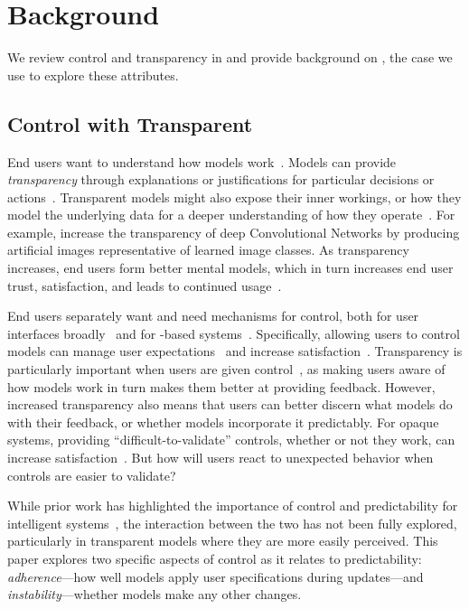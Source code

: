\section{Background}
We review control and transparency in  and provide background on \hltm{}, the case we use to explore these attributes.

\subsection{Control with Transparent }

End users want to understand how  models work~\cite{Lim2009AssessingApplications}. Models can provide \textit{transparency} through explanations or justifications for particular decisions or actions~\cite{Biran2017Human-centricPredictions, Bilgic2005ExplainingPromotion}. Transparent models might also expose their inner workings, or how they model the underlying data for a deeper understanding of how they operate~\cite{Chaney2012VisualizingModels}. For example,  increase the transparency of deep Convolutional Networks by producing artificial images representative of learned image classes. As transparency increases, end users form better mental models, which 
in turn increases end user trust, satisfaction, and leads to continued usage~\cite{Lim2009WhySystems, Herlocker2000ExplainingRecommendations, Pu2006TrustInterfaces, Kulesza2013TooModels}.

End users separately want and need mechanisms for control, both for user interfaces broadly~\cite{Shneiderman2009DesigningInteraction} and for -based systems~\cite{Amershi2019GuidelinesInteraction}. Specifically, allowing users to control models can
manage user expectations~\cite{Kocielnik2019WillSystems} and
increase satisfaction~\cite{Roy2019AutomationBetter, Vaccaro2018TheSettings}. 
Transparency is particularly important when users are given control~\cite{Kulesza2010ExplanatoryPrograms, Rosenthal2010TowardsData}, as making users aware of how models work in turn makes them better at providing feedback. 
However, increased transparency also means that users can better discern what models do with their feedback, or whether models incorporate it predictably.
For opaque systems, providing ``difficult-to-validate'' controls, whether or not they work, can increase satisfaction~\cite{Vaccaro2018TheSettings}. 
But how will users react to unexpected behavior when controls are easier to validate?

While prior work has highlighted the importance of control and predictability for intelligent systems~\cite{Hook2000StepsReal}, the interaction between the two has not been fully explored, particularly in transparent models where they are more easily perceived. This paper explores two specific aspects of control as it relates to predictability: \textit{adherence}---how well models apply user specifications during
updates---and \textit{instability}---whether models make any other changes.


